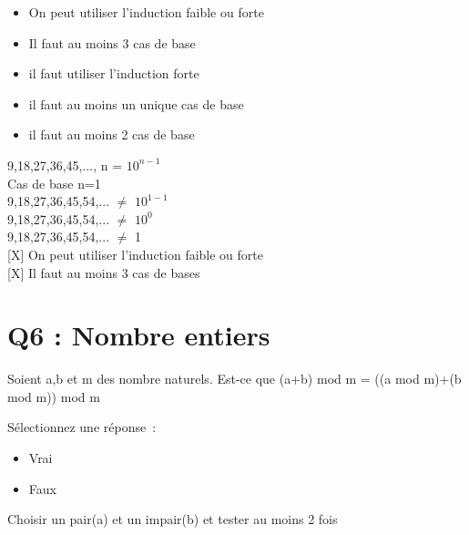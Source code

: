 \begin{itemize}[label=$\square$]
\item On peut utiliser l’induction faible ou forte
\item Il faut au moins 3 cas de base
\item il faut utiliser l’induction forte
\item il faut au moins un unique cas de base
\item il faut au moins 2 cas de base
\end{itemize}

\vspace{5mm} %

9,18,27,36,45,..., n = $10^{n-1}$  \\

Cas de base n=1 \\

9,18,27,36,45,54,... $\neq$ $10^{1-1}$  \\

9,18,27,36,45,54,... $\neq$ $10^{0}$  \\

9,18,27,36,45,54,... $\neq$ 1  \\

[X] On peut utiliser l’induction faible ou forte \\

[X] Il faut au moins 3 cas de bases \\


\newpage
\section{Q6 : Nombre entiers}

\vspace{5mm} %


Soient a,b et m des nombre naturels. Est-ce que (a+b) mod m = ((a mod m)+(b mod m)) mod m \\

\vspace{2mm} %

Sélectionnez une réponse :
\begin{itemize}[label=$\square$]
\item Vrai
\item Faux
\end{itemize}

\vspace{4mm} %

Choisir un pair(a) et un impair(b) et tester au moins 2 fois\\

